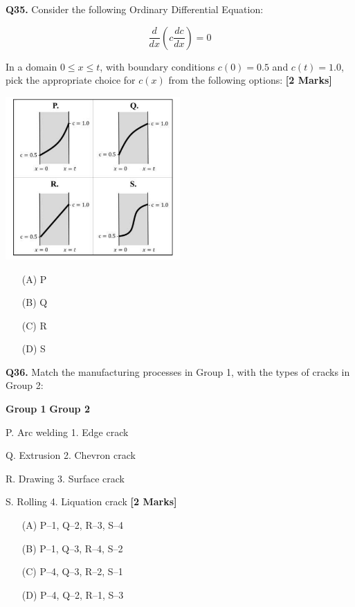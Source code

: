 \documentclass[11pt]{article}
\newcommand{\questionb}[2]{
    \noindent\textbf{Q#2.} #1 \hfill \textbf{[2 Marks]}
}
\begin{document}
\questionb{Consider the following Ordinary Differential Equation:  

\[
\frac{d}{dx} \left( c \frac{dc}{dx} \right) = 0
\]

In a domain \(0 \leq x \leq t\), with boundary conditions \(c(0) = 0.5\) and \(c(t) = 1.0\), pick the appropriate choice for \(c(x)\) from the following options:}{35}
\begin{center}
\includegraphics[width=0.5\textwidth]{figures/35.png}
\end{center}
\begin{enumerate}
    \item[(A)] P  
    \item[(B)] Q  
    \item[(C)] R  
    \item[(D)] S  
\end{enumerate}
\vspace{0.5cm}

\questionb{Match the manufacturing processes in Group 1, with the types of cracks in Group 2:

\textbf{Group 1} \hspace{2.5cm} \textbf{Group 2}

P. Arc welding \hspace{2cm} 1. Edge crack  

Q. Extrusion \hspace{2.4cm} 2. Chevron crack  

R. Drawing \hspace{2.5cm} 3. Surface crack  

S. Rolling \hspace{2.5cm} 4. Liquation crack}{36}
\begin{enumerate}
    \item[(A)] P–1, Q–2, R–3, S–4  
    \item[(B)] P–1, Q–3, R–4, S–2  
    \item[(C)] P–4, Q–3, R–2, S–1  
    \item[(D)] P–4, Q–2, R–1, S–3  
\end{enumerate}
\vspace{0.5cm}
\end{document}

